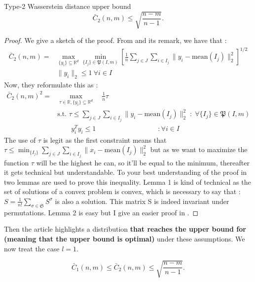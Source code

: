 \documentclass{amsart}
\newcommand{\RR}{\mathbb{R}}
\begin{document}
\begin{theorem} Type-2 Wasserstein distance upper bound
    $$\bar{C}_2\left(n,m \right)\leq \sqrt{\frac{n-m}{n-1}}.$$
\end{theorem}
\begin{proof}
    We give a sketch of the proof. From  and its remark, we have that : 
    \begin{align*}\bar{C}_2\left(n,m\right)=&
        \max_{\{y_i\}\subseteq\RR^d}\min_{\{I_j\}\in\mathfrak{P}\left(I,m\right)}\left[\frac{1}{n}\sum_{j\in J}\sum_{i\in I_j}\lVert y_i-\text{mean}\left(I_j\right)\rVert_2^2\right]^{1/2} \\ &\lVert y_i\rVert_2\leq1 \:\forall i\in I
    \end{align*}
    Now, they reformulate this as : 
    \begin{align*}\bar{C}_2\left(n,m\right)^2=&
        \max_{\tau\in\RR, \{y_i\}\subseteq\RR^d}\quad\frac{1}{n}\tau \\ &\text{s.t. }\tau\leq\sum_{j\in J}\sum_{i\in I_j}\lVert y_i-\text{mean}\left(I_j\right)\rVert_2^2\; :\; \forall \{I_j\}\in\mathfrak{P}\left(I,m\right) \\
        &\quad\quad y_i^Ty_i\leq1 \quad\quad\quad\quad\quad\quad\quad\quad\quad : \forall i\in I
    \end{align*}
    The use of $\tau$ is legit as the first constraint means that $\tau\leq\min_{\{I_j\}}\sum_{j\in J}\sum_{i\in I_j}\lVert x_i-\text{mean}(I_j)\rVert_2^2$ but as we want to maximize the function $\tau$ will be the highest he can, so it'll be equal to the minimum, thereafter it gets technical but understandable. To your best understanding of the proof in \cite[Theorem 2]{rujeerapaiboon_scenario_2022} two lemmas are used to prove this inequality. Lemma 1 is kind of technical as the set of solutions of a convex problem is convex, which is necessary to say that : $S=\frac{1}{n!}\sum_{\sigma\in\mathfrak{S}}S^\sigma$ is also a solution. This matrix S is indeed invariant under permutations. Lemma 2 is easy but I give an easier proof in .
\end{proof}

Then the article highlights a distribution \textbf{that reaches the upper bound for (meaning that the upper bound is optimal)} under these assumptions. We now treat the case $l=1$.

\begin{theorem}
    $$\bar{C}_1\left(n,m \right)\leq\bar{C}_2\left(n,m \right) \leq\sqrt{\frac{n-m}{n-1}}.$$
\end{theorem}
\end{document}
